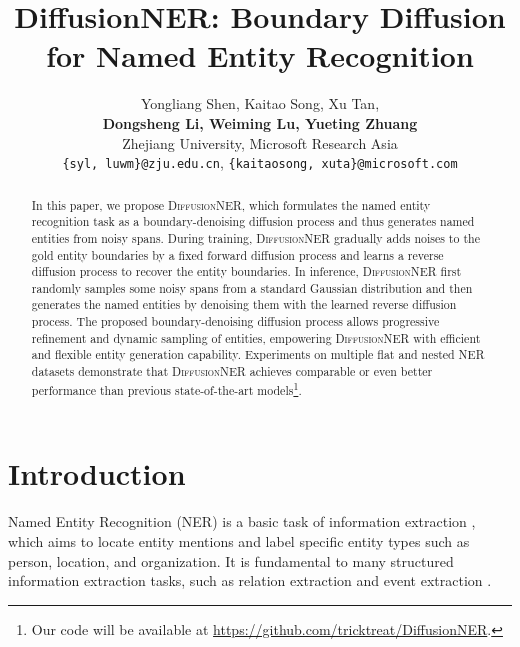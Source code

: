 \documentclass[11pt]{article}
\title{DiffusionNER: Boundary Diffusion for Named Entity Recognition}
\author{
Yongliang Shen, Kaitao Song, Xu Tan,\\
\textbf{Dongsheng Li, Weiming Lu, Yueting Zhuang}\\
  Zhejiang University, Microsoft Research Asia \\ 
  \texttt{\{syl, luwm\}@zju.edu.cn},
  \texttt{\{kaitaosong, xuta\}@microsoft.com}
}
\begin{document}
\maketitle

\renewcommand{\thefootnote}{\fnsymbol{footnote}}
\renewcommand{\thefootnote}{\arabic{footnote}}

\begin{abstract}


In this paper, we propose \textsc{DiffusionNER}, which formulates the named entity recognition task as a boundary-denoising diffusion process and thus generates named entities from noisy spans. During training, \textsc{DiffusionNER} gradually adds noises to the gold entity boundaries by a fixed forward diffusion process and learns a reverse diffusion process to recover the entity boundaries. In inference, \textsc{DiffusionNER} first randomly samples some noisy spans from a standard Gaussian distribution and then generates the named entities by denoising them with the learned reverse diffusion process. 
The proposed boundary-denoising diffusion process allows progressive refinement and dynamic sampling of entities, empowering \textsc{DiffusionNER} with efficient and flexible entity generation capability.
Experiments on multiple flat and nested NER datasets demonstrate that \textsc{DiffusionNER} achieves comparable or even better performance than previous state-of-the-art models\footnote{\;Our code will be available at \url{https://github.com/tricktreat/DiffusionNER}.}.





\end{abstract}

\section{Introduction}



Named Entity Recognition (NER) is a basic task of information extraction \citep{tjong-kim-sang-de-meulder-2003-introduction}, which aims to locate entity mentions and label specific entity types such as {person}, {location}, and {organization}. It is fundamental to many structured information extraction tasks,
such as relation extraction \citep{li-ji-2014-incremental, miwa-bansal-2016-end} and event extraction \citep{mcclosky-etal-2011-event, wadden-etal-2019-entity}.
\end{document}
